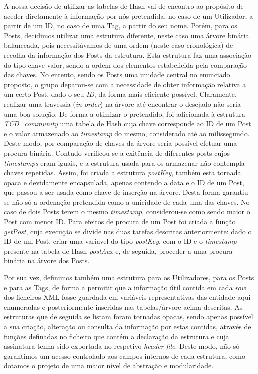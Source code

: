 \documentclass[a4paper, 11pt, oneside]{article}
\begin{document}
A nossa decisão de utilizar as tabelas de Hash vai de encontro ao propósito de aceder diretamente à informação por nós pretendida, no caso de um Utilizador, a partir de um ID, no caso de uma Tag, a partir do seu nome. Porém, para os Posts, decidimos utilizar uma estrutura diferente, neste caso uma árvore binária balanceada, pois necessitávamos de uma ordem (neste caso cronológica) de recolha da informação dos Posts da estrutura. Esta estrutura faz uma associação do tipo chave-valor, sendo a ordem dos elementos estabelicida pela comparação das chaves. No entento, sendo os Posts uma unidade central no enunciado proposto, o grupo deparou-se com a necessidade de obter informação relativa a um certo Post, dado o seu \textit{ID}, da forma mais eficiente possível. Claramente, realizar uma travessia (\textit{in-order}) na árvore até encontrar o desejado não seria uma boa solução. De forma a otimizar o pretendido, foi adicionada à estrutura \textit{TCD\_community} uma tabela de Hash cuja chave corresponde ao ID de um Post e o valor armazenado ao \textit{timestamp} do mesmo, considerado até ao milissegundo. Deste modo, por comparação de chaves da árvore seria possível efetuar uma procura binária. Contudo verificou-se a exitência de diferentes posts cujos \textit{timestamps} eram iguais, e a estrutura usada para os armazenar não contempla chaves repetidas. Assim, 
foi criada a estrutura \textit{postKey}, também esta tornada opaca e devidamente encapsulada, apenas contendo a data e o ID de um Post, que passou a ser usada como chave de inserção na árvore. Desta forma garantiu-se não só a ordenação pretendida como a unicidade de cada uma das chaves. No caso de dois Posts terem o mesmo \textit{timestamp}, considerou-se como sendo maior o Post com menor ID. Para efeitos de procura de um Post foi criada a função \textit{getPost}, cuja execução se divide nas duas tarefas descritas anteriormente: dado o ID de um Post, criar uma variavel do tipo \textit{postKey}, com o ID e o \textit{timestamp} presente na tabela de Hash \textit{postAux} e, de seguida, proceder a uma procura binária na árvore dos Posts.

Por sua vez, definimos também uma estrutura para os Utilizadores, para os Posts e para as Tags, de forma a permitir que a informação útil contida em cada \textit{row} dos ficheiros XML fosse guardada em variáveis representativas das entidade aqui enumeradas e posteriormente inseridas nas tabelas/árvore acima descritas. As estruturas que de seguida se listam foram tornadas opacas, sendo apenas possível a sua criação, alteração ou consulta da informação por estas contidas, através de funções definadas no ficheiro que contém a declaração da estrutura e cuja assinatura tenha sido exportada no respetivo \textit{header file}. Deste modo, não só garantimos um acesso controlado aos campos internos de cada estrutura, como dotamos o projeto de uma maior nível de abstração e modularidade.
\end{document}
